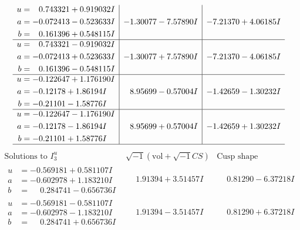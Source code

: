 \documentclass[1p]{elsarticle_modified}
\theoremstyle{definition}
\newcommand{\I}{\sqrt{-1}}
\begin{document}
$$\begin{array}{c|c|c}
\begin{aligned}
u &= \phantom{-}0.743321 + 0.919032 I \\
a &= -0.072413 - 0.523633 I \\
b &= \phantom{-}0.161396 + 0.548115 I\end{aligned}
 & -1.30077 - 7.57890 I & -7.21370 + 4.06185 I \\ \hline\begin{aligned}
u &= \phantom{-}0.743321 - 0.919032 I \\
a &= -0.072413 + 0.523633 I \\
b &= \phantom{-}0.161396 - 0.548115 I\end{aligned}
 & -1.30077 + 7.57890 I & -7.21370 - 4.06185 I \\ \hline\begin{aligned}
u &= -0.122647 + 1.176190 I \\
a &= -0.12178 + 1.86194 I \\
b &= -0.21101 - 1.58776 I\end{aligned}
 & \phantom{-}8.95699 - 0.57004 I & -1.42659 - 1.30232 I \\ \hline\begin{aligned}
u &= -0.122647 - 1.176190 I \\
a &= -0.12178 - 1.86194 I \\
b &= -0.21101 + 1.58776 I\end{aligned}
 & \phantom{-}8.95699 + 0.57004 I & -1.42659 + 1.30232 I\\
 \hline 
 \end{array}$$\newpage$$\begin{array}{c|c|c}  
\text{Solutions to }I^u_{3}& \I (\text{vol} + \sqrt{-1}CS) & \text{Cusp shape}\\
 \hline 
\begin{aligned}
u &= -0.569181 + 0.581107 I \\
a &= -0.602978 + 1.183210 I \\
b &= \phantom{-}0.284741 - 0.656736 I\end{aligned}
 & \phantom{-}1.91394 + 3.51457 I & \phantom{-}0.81290 - 6.37218 I \\ \hline\begin{aligned}
u &= -0.569181 - 0.581107 I \\
a &= -0.602978 - 1.183210 I \\
b &= \phantom{-}0.284741 + 0.656736 I\end{aligned}
 & \phantom{-}1.91394 - 3.51457 I & \phantom{-}0.81290 + 6.37218 I \\ \hline\begin{aligned}

\end{aligned}
\end{array}$$
\end{document}
